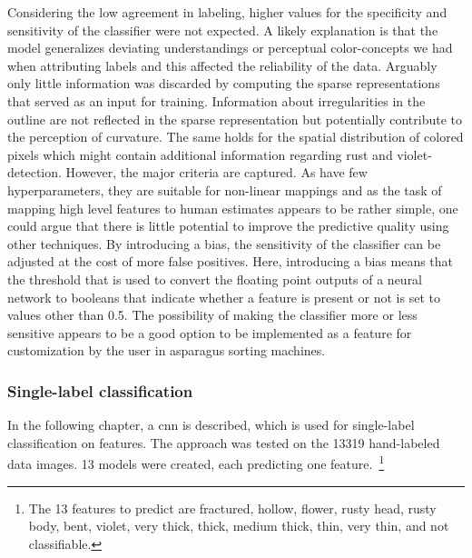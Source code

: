 Considering the low agreement in labeling, higher values for the specificity and sensitivity of the classifier were not expected. A likely explanation is that the model generalizes deviating understandings or perceptual color-concepts we had when attributing labels and this affected the reliability of the data. Arguably only little information was discarded by computing the sparse representations that served as an input for training. Information about irregularities in the outline are not reflected in the sparse representation but potentially contribute to the perception of curvature. The same holds for the spatial distribution of colored pixels which might contain additional information regarding rust and violet-detection. However, the major criteria are captured. As  have few hyperparameters, they are suitable for non-linear mappings and as the task of mapping high level features to human estimates appears to be rather simple, one could argue that there is little potential to improve the predictive quality using other techniques. By introducing a bias, the sensitivity of the classifier can be adjusted at the cost of more false positives. Here, introducing a bias means that the threshold that is used to convert the floating point outputs of a neural network to booleans that indicate whether a feature is present or not is set to values other than 0.5. The possibility of making the classifier more or less sensitive appears to be a good option to be implemented as a feature for customization by the user in asparagus sorting machines.


\subsubsection{Single-label classification}
\label{subsec:SingleLabel}

In the following chapter, a \acrlong{cnn} is described, which is used for single-label classification on features. The approach was tested on the 13319 hand-labeled data images. 13 models were created, each predicting one feature.~\footnote{The 13 features to predict are fractured, hollow, flower, rusty head, rusty body, bent, violet, very thick, thick, medium thick, thin, very thin, and not classifiable.}

